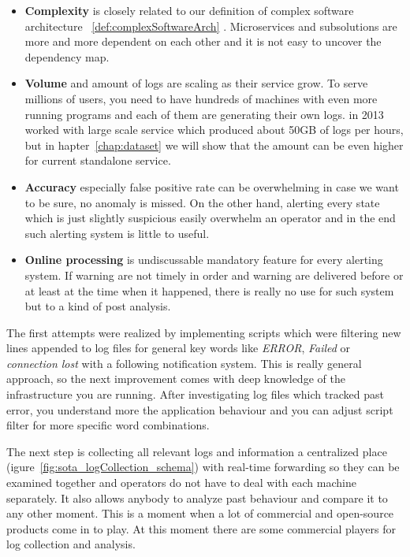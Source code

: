 \begin{itemize}
    \item \textbf{Complexity} is closely related to our definition of complex software architecture ~\ref{def:complexSoftwareArch} . Microservices and subsolutions are more and more dependent on each other and it is not easy to uncover the dependency map. 
    \item \textbf{Volume} and amount of logs are scaling as their service grow. To serve millions of users, you need to have hundreds of machines with even more running programs and each of them are generating their own logs. \cite{mi2013toward} in 2013 worked with large scale service which produced about 50GB of logs per hours, but in hapter~\ref{chap:dataset} we will show that the amount can be even higher for current standalone service.
    \item \textbf{Accuracy} especially false positive rate can be overwhelming in case we want to be sure, no anomaly is missed. On the other hand, alerting every state which is just slightly suspicious  easily overwhelm an operator and in the end such alerting system is little to useful. 
    \item \textbf{Online processing } is undiscussable mandatory feature for every alerting system. If warning are not timely in order and warning are delivered before or at least at the time when it happened, there is really no use for such system but to a kind of post analysis.
\end{itemize}

The first attempts were realized by implementing scripts which were filtering new lines appended to log files for general key words like \textit{ERROR}, \textit{Failed} or \textit{connection lost} with a following notification system. This is really  general approach, so the next improvement comes with deep knowledge of the infrastructure you are running. After investigating log files which tracked past error, you understand more the application behaviour and you can adjust script filter for more specific word combinations.

The next step is collecting all relevant logs and information  a centralized place \cite{rabkin2010chukwa}(igure~\ref{fig:sota_logCollection_schema}) with real-time forwarding so they can be examined together and operators do not have to deal with each machine separately. It also allows anybody to analyze past behaviour and compare it to any other moment. This is a moment when a lot of commercial and open-source products come in to play. At this moment there are some commercial players for log collection and analysis.

